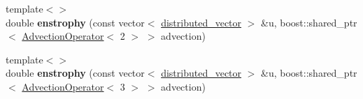 \begin{DoxyCompactItemize}
\item 
\hypertarget{classnatrium_1_1PhysicalProperties_a61e26b74727e7f5cba347dcb60839f27}{
{\footnotesize template$<$$>$ }\\double {\bfseries enstrophy} (const vector$<$ \hyperlink{namespacenatrium_a903d2b92917f582f2ff05f52160ab811}{distributed\_\-vector} $>$ \&u, boost::shared\_\-ptr$<$ \hyperlink{classnatrium_1_1AdvectionOperator}{AdvectionOperator}$<$ 2 $>$ $>$ advection)}
\label{classnatrium_1_1PhysicalProperties_a61e26b74727e7f5cba347dcb60839f27}

\item 
\hypertarget{classnatrium_1_1PhysicalProperties_a2a50c0d8c1f4cee31af6c577a86b9bf1}{
{\footnotesize template$<$$>$ }\\double {\bfseries enstrophy} (const vector$<$ \hyperlink{namespacenatrium_a903d2b92917f582f2ff05f52160ab811}{distributed\_\-vector} $>$ \&u, boost::shared\_\-ptr$<$ \hyperlink{classnatrium_1_1AdvectionOperator}{AdvectionOperator}$<$ 3 $>$ $>$ advection)}
\label{classnatrium_1_1PhysicalProperties_a2a50c0d8c1f4cee31af6c577a86b9bf1}

\end{DoxyCompactItemize}
